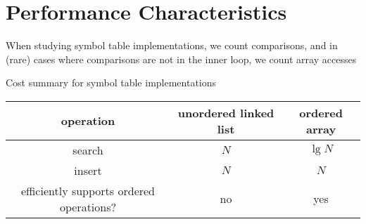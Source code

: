 \documentclass[8pt,a4paper,compress]{beamer}
\begin{document}
\section{Performance Characteristics}
\begin{frame}[fragile]
\pause

When studying symbol table implementations, we count comparisons, and in (rare) cases where comparisons are not in the inner loop, we count array accesses

\pause
\bigskip

Cost summary for symbol table implementations
\begin{center}
\begin{tabular}{ccc}
operation & unordered linked list & ordered array \\ \hline
search & $N$ & $\lg N$ \\
insert & $N$ & $N$ \\
efficiently supports ordered operations? & no & yes
\end{tabular} 
\end{center}
\end{frame}
\end{document}
